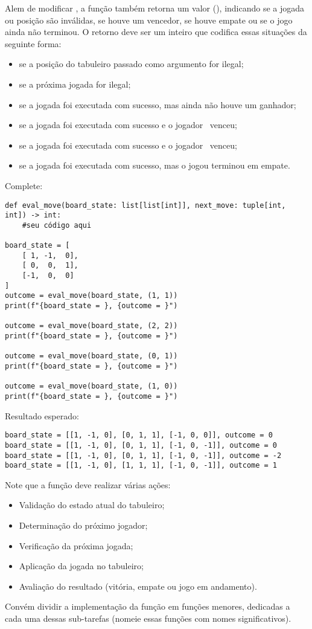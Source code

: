 Alem de modificar , a função também retorna um valor  (), indicando se a
jogada ou posição são inválidas, se houve um vencedor, se houve empate ou se o jogo ainda não terminou.
O retorno  deve ser um inteiro que codifica essas situações da seguinte forma:
\begin{itemize}
\item {} se a posição do tabuleiro passado como argumento for ilegal;
\item {} se a próxima jogada for ilegal;
\item {} se a jogada foi executada com sucesso, mas ainda não houve um ganhador;
\item {} se a jogada foi executada com sucesso e o jogador \px~venceu;
\item {} se a jogada foi executada com sucesso e o jogador \po~venceu;
\item {} se a jogada foi executada com sucesso, mas o jogou terminou em empate.
\end{itemize}

Complete:
\begin{verbatim}
def eval_move(board_state: list[list[int]], next_move: tuple[int, int]) -> int:
    #seu código aqui

board_state = [
    [ 1, -1,  0],
    [ 0,  0,  1],
    [-1,  0,  0]
]
outcome = eval_move(board_state, (1, 1))
print(f"{board_state = }, {outcome = }")

outcome = eval_move(board_state, (2, 2))
print(f"{board_state = }, {outcome = }")

outcome = eval_move(board_state, (0, 1))
print(f"{board_state = }, {outcome = }")

outcome = eval_move(board_state, (1, 0))
print(f"{board_state = }, {outcome = }")
\end{verbatim}

Resultado esperado:
\begin{verbatim}
board_state = [[1, -1, 0], [0, 1, 1], [-1, 0, 0]], outcome = 0
board_state = [[1, -1, 0], [0, 1, 1], [-1, 0, -1]], outcome = 0
board_state = [[1, -1, 0], [0, 1, 1], [-1, 0, -1]], outcome = -2
board_state = [[1, -1, 0], [1, 1, 1], [-1, 0, -1]], outcome = 1
\end{verbatim}

Note que a função deve realizar várias ações:
\begin{itemize}
\item Validação do estado atual do tabuleiro;
\item Determinação do próximo jogador;
\item Verificação da próxima jogada;
\item Aplicação da jogada no tabuleiro;
\item Avaliação do resultado (vitória, empate ou jogo em andamento).
\end{itemize}

Convém dividir a implementação da função  em funções menores, dedicadas a cada uma dessas
sub-tarefas (nomeie essas funções com nomes significativos).

